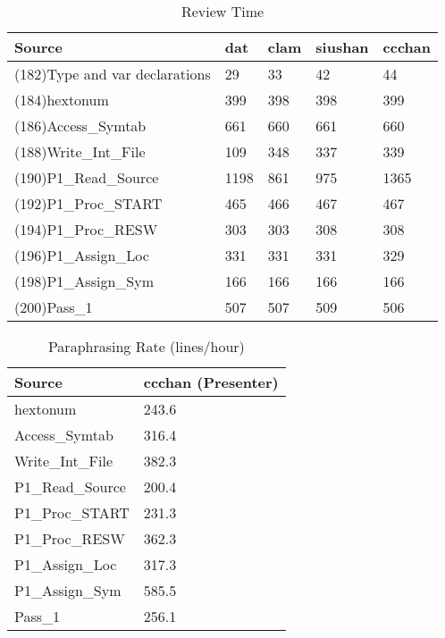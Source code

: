 \begin{table}[hb]
\begin{center}
\begin{tabular}{|l|l|l|l|l|}
\hline
Source & dat & clam & siushan & ccchan\\
\hline
(182)Type and var declarations & 29 & 33 & 42 & 44\\
(184)hextonum & 399 & 398 & 398 & 399\\
(186)Access\_Symtab & 661 & 660 & 661 & 660\\
(188)Write\_Int\_File & 109 & 348 & 337 & 339\\
(190)P1\_Read\_Source & 1198 & 861 & 975 & 1365\\
(192)P1\_Proc\_START & 465 & 466 & 467 & 467\\
(194)P1\_Proc\_RESW & 303 & 303 & 308 & 308\\
(196)P1\_Assign\_Loc & 331 & 331 & 331 & 329\\
(198)P1\_Assign\_Sym & 166 & 166 & 166 & 166\\
(200)Pass\_1 & 507 & 507 & 509 & 506\\
\hline
\end{tabular}
\end{center}
\caption{Review Time}
\end{table}

\begin{table}[hb]
\begin{center}
\begin{tabular}{|l|l|}
\hline
Source & ccchan (Presenter)\\
\hline
hextonum & 243.6\\
Access\_Symtab & 316.4\\
Write\_Int\_File & 382.3\\
P1\_Read\_Source & 200.4\\
P1\_Proc\_START & 231.3\\
P1\_Proc\_RESW & 362.3\\
P1\_Assign\_Loc & 317.3\\
P1\_Assign\_Sym & 585.5\\
Pass\_1 & 256.1\\
\hline
\end{tabular}
\end{center}
\caption{Paraphrasing Rate (lines/hour)}
\end{table}


